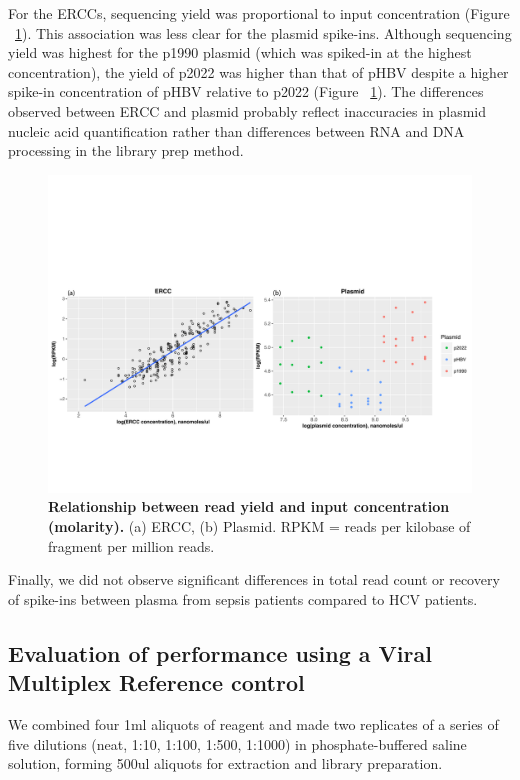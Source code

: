 For the ERCCs, sequencing yield was proportional to input concentration (Figure ~\ref{fig:1bcontrolconc}). This association was less clear for the plasmid spike-ins. Although sequencing yield was highest for the p1990 plasmid (which was spiked-in at the highest concentration), the yield of p2022 was higher than that of pHBV despite a higher spike-in concentration of pHBV relative to p2022 (Figure ~\ref{fig:1bcontrolconc}). The differences observed between ERCC and plasmid probably reflect inaccuracies in plasmid nucleic acid quantification rather than differences between RNA and DNA processing in the library prep method. 



\begin{figure}[htbp]
\centering
\includegraphics[width=\textwidth, trim={0 2cm 0 6cm},clip]{./Results1/Images/1b_control_conc.pdf}
\caption[Relationship between read yield and input concentration]{\textbf{Relationship between read yield and input concentration (molarity).} (a) ERCC, (b) Plasmid. RPKM = reads per kilobase of fragment per million reads.}
\label{fig:1bcontrolconc}
\end{figure}


Finally, we did not observe significant differences in total read count or recovery of spike-ins between plasma from sepsis patients compared to HCV patients.




\subsection{Evaluation of performance using a Viral Multiplex Reference control}
We combined four 1ml aliquots of reagent and made two replicates of a series of five dilutions (neat, 1:10, 1:100, 1:500, 1:1000) in phosphate-buffered saline solution, forming 500ul aliquots for extraction and library preparation. 

